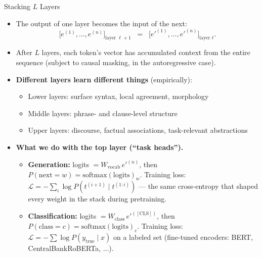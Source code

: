 \documentclass[10pt,english,aspectratio=169]{beamer}
\begin{document}
\begin{frame}{Stacking $L$ Layers}
\begin{itemize}
\item The output of one layer becomes the input of the next:
\[
   \bigl[e^{(1)}, \ldots, e^{(n)}\bigr]_{\text{layer } \ell + 1}
   \;\;=\;\;
   \bigl[e'^{(1)}, \ldots, e'^{(n)}\bigr]_{\text{layer } \ell}.
\]

\medskip
\item After $L$ layers, each token's vector has accumulated context from the entire sequence (subject to causal masking, in the autoregressive case).

\medskip
\item \textbf{Different layers learn different things} (empirically):
\begin{itemize}
    \item Lower layers: surface syntax, local agreement, morphology
    \item Middle layers: phrase- and clause-level structure
    \item Upper layers: discourse, factual associations, task-relevant abstractions
\end{itemize}

\medskip
\item \textbf{What we do with the top layer (``task heads'').}
\begin{itemize}
    \item \textbf{Generation:} logits $= W_{\text{vocab}}\, e'^{(n)}$, then $P(\text{next}=w) = \mathrm{softmax}(\text{logits})_{w}$. Training loss: $\mathcal{L} = -\sum_{i} \log P(t^{(i+1)} \mid t^{(1:i)})$ --- the same cross-entropy that shaped every weight in the stack during pretraining.
    \item \textbf{Classification:} logits $= W_{\text{class}}\, e'^{([\text{CLS}])}$, then $P(\text{class}=c) = \mathrm{softmax}(\text{logits})_{c}$. Training loss: $\mathcal{L} = -\sum \log P(y_{\text{true}} \mid x)$ on a labeled set (fine-tuned encoders: BERT, CentralBankRoBERTa, $\ldots$).
\end{itemize}
\end{itemize}
\end{frame}
\end{document}
